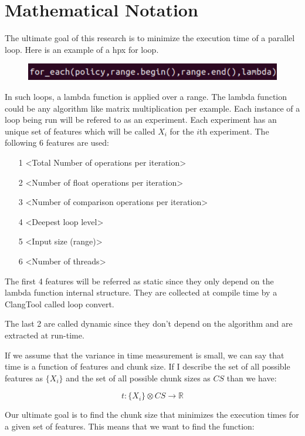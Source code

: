 \section{Mathematical Notation}
The ultimate goal of this research is to minimize the execution time of a parallel loop. Here is an example of a hpx for loop. 

\begin{figure}[h]
	\centering
	\includegraphics[scale=0.8]{images/for_each_call.pdf}
\end{figure}

In such loops, a lambda function is applied over a range. The lambda function could be any algorithm like matrix multiplication per example. Each instance of a loop being run will be refered to as an experiment. Each experiment has an unique set of features which will be called $X_i$ for the $i$th experiment. The following 6 features are used:

\begin{itemize}
	\item[1] <Total Number of operations per iteration>
	\item[2] <Number of float operations per iteration>
	\item[3] <Number of comparison operations per iteration>
	\item[4] <Deepest loop level>
	\item[5] <Input size (range)>
	\item[6] <Number of threads>
\end{itemize}

The first 4 features will be referred as static since they only depend on the lambda function internal structure. They are collected at compile time by a ClangTool called loop convert.

The last 2 are called dynamic since they don't depend on the algorithm and are extracted at run-time.

If we assume that the variance in time measurement is small, we can say that time is a function of features and chunk size. If I describe the set of all possible features as $\{X_i\}$ and the set of all possible chunk sizes as $CS$ than we have:

$$t:\{X_i\} \otimes CS \rightarrow \mathbb{R}$$

Our ultimate goal is to find the chunk size that minimizes the execution times for a given set of features. This means that we want to find the function:

